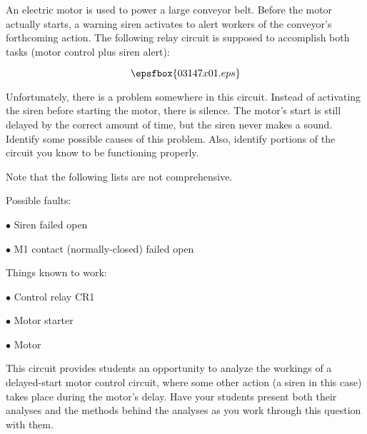 

An electric motor is used to power a large conveyor belt.  Before the motor actually starts, a warning siren activates to alert workers of the conveyor's forthcoming action.  The following relay circuit is supposed to accomplish both tasks (motor control plus siren alert):

$$\epsfbox{03147x01.eps}$$

Unfortunately, there is a problem somewhere in this circuit.  Instead of activating the siren before starting the motor, there is silence.  The motor's start is still delayed by the correct amount of time, but the siren never makes a sound.  Identify some possible causes of this problem.  Also, identify portions of the circuit you know to be functioning properly.







Note that the following lists are not comprehensive.

\vskip 10pt

\goodbreak

\noindent
Possible faults:

\medskip
\item{$\bullet$} Siren failed open 
\item{$\bullet$} M1 contact (normally-closed) failed open
\medskip

\vskip 10pt

\goodbreak

\noindent
Things known to work:

\medskip
\item{$\bullet$} Control relay CR1
\item{$\bullet$} Motor starter
\item{$\bullet$} Motor
\medskip







This circuit provides students an opportunity to analyze the workings of a delayed-start motor control circuit, where some other action (a siren in this case) takes place during the motor's delay.  Have your students present both their analyses and the methods behind the analyses as you work through this question with them.




